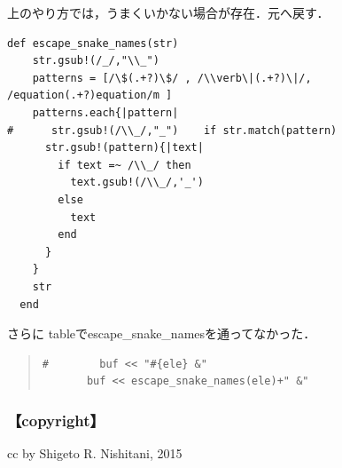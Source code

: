 上のやり方では，うまくいかない場合が存在．元へ戻す．
\begin{lstlisting}[style=customRuby]
def escape_snake_names(str)
    str.gsub!(/_/,"\\_")
    patterns = [/\$(.+?)\$/ , /\\verb\|(.+?)\|/, /equation(.+?)equation/m ]
    patterns.each{|pattern|
#      str.gsub!(/\\_/,"_")    if str.match(pattern)                                                                                   
      str.gsub!(pattern){|text|
        if text =~ /\\_/ then
          text.gsub!(/\\_/,'_')
        else
          text
        end
      }
    }
    str
  end
\end{lstlisting}
さらに
tableでescape\_snake\_namesを通ってなかった．
\begin{quote}\begin{verbatim}
#        buf << "#{ele} &"
       buf << escape_snake_names(ele)+" &"
\end{verbatim}\end{quote}
\subsubsection{【copyright】}
cc by Shigeto R. Nishitani, 2015

